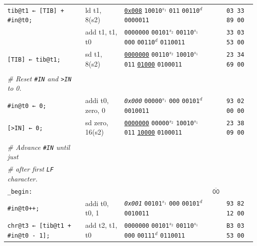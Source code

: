 \documentclass[a4paper,12pt,final]{article}
\begin{document}
\begin{table}[!htbp]
\begin{adjustwidth}{-1cm}{-1cm}
\begin{center}
\begin{tabular}{l|ll|l|l}
\hspace{1em} \texttt{tib@t1 ← [TIB] + \#in@t0;} & ld t1, 8(s2) & \uline{\texttt{0x008}}                    \texttt{10010}​\(^{s_{1}}\) \texttt{011} \texttt{00110}​\(^{d}\)  \texttt{0000011} &  & \texttt{03 33 89 00}\\[0pt]
\hspace{1em} & add t1, t1, t0 & \texttt{0000000} \texttt{00101}​\(^{s_{2}}\) \texttt{00110}​\(^{s_{1}}\) \texttt{000} \texttt{00110}​\(^{d}\)  \texttt{0110011} &  & \texttt{33 03 53 00}\\[0pt]
\hspace{1em} \texttt{[TIB] ← tib@t1;} & sd t1, 8(s2) & \uline{\texttt{0000000}} \texttt{00110}​\(^{s_{2}}\) \texttt{10010}​\(^{s_{1}}\) \texttt{011} \uline{\texttt{01000}} \texttt{0100011} &  & \texttt{23 34 69 00}\\[0pt]
\hspace{1em} &  &  &  & \\[0pt]
\hspace{1em} \emph{\# Reset \texttt{\#IN} and \texttt{>IN} to 0.} &  &  &  & \\[0pt]
\hspace{1em} \texttt{\#in@t0 ← 0;} & addi t0, zero, 0 & \emph{\texttt{0x000}}                    \texttt{00000}​\(^{s_{1}}\) \texttt{000} \texttt{00101}​\(^{d}\)  \texttt{0010011} &  & \texttt{93 02 00 00}\\[0pt]
\hspace{1em} \texttt{[>IN] ← 0;} & sd zero, 16(s2) & \uline{\texttt{0000000}} \texttt{00000}​\(^{s_{2}}\) \texttt{10010}​\(^{s_{1}}\) \texttt{011} \uline{\texttt{10000}} \texttt{0100011} &  & \texttt{23 38 09 00}\\[0pt]
\hspace{1em} &  &  &  & \\[0pt]
\hspace{1em} \emph{\# Advance \texttt{\#IN} until just} &  &  &  & \\[0pt]
\hspace{1em} \emph{\# after first \texttt{LF} character.} &  &  &  & \\[0pt]
\texttt{\_begin:} &  &  & \(\overline{\texttt{00}}\) & \\[0pt]
\hspace{1em} \texttt{\#in@t0++;} & addi t0, t0, 1 & \emph{\texttt{0x001}}                    \texttt{00101}​\(^{s_{1}}\) \texttt{000} \texttt{00101}​\(^{d}\)  \texttt{0010011} &  & \texttt{93 82 12 00}\\[0pt]
\hspace{1em} \texttt{chr@t3 ← [tib@t1 + \#in@t0 - 1];} & add t2, t1, t0 & \texttt{0000000} \texttt{00101}​\(^{s_{2}}\) \texttt{00110}​\(^{s_{1}}\) \texttt{000} \texttt{00111}​\(^{d}\)  \texttt{0110011} &  & \texttt{B3 03 53 00}\\[0pt]

\end{tabular}
\end{center}
\end{adjustwidth}
\end{table}
\end{document}
